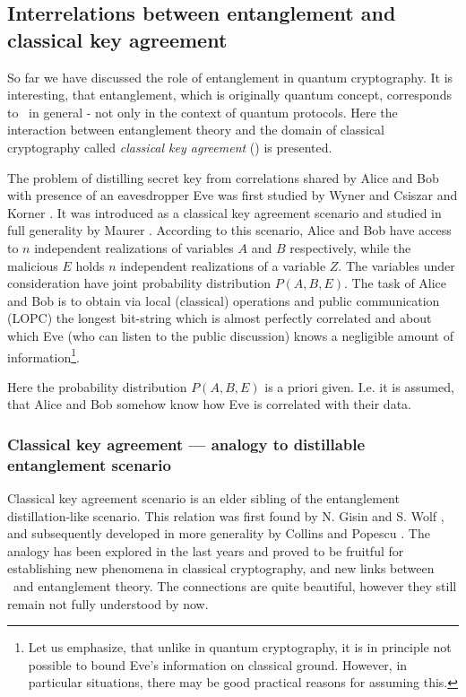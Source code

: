 \documentclass[rmp,12pt,preprint]{revtex4-2}
\begin{document}
\subsection{Interrelations between entanglement and classical key agreement}
\label{subsec:inter-ent-CKA}
So far we have discussed the role of entanglement in quantum
cryptography. It is interesting, that entanglement, which is
originally quantum concept, corresponds to \privacy\ in general -
not only in the context of quantum protocols. Here the interaction
between entanglement theory and the domain of classical cryptography
called {\it classical key agreement} (\cka) is presented.

The problem of distilling secret key from correlations shared by
Alice and Bob with presence of an eavesdropper Eve was first studied
by Wyner \cite{Wyner_key_agreement} and Csiszar and Korner
\cite{CsisarKorner_key_agreement}. It was introduced as a classical
key agreement scenario and studied in full generality by Maurer
\cite{Maurer_key_agreement}. According to this scenario, Alice and
Bob have access to $n$ independent realizations of variables $A$ and
$B$ respectively, while the malicious $E$ holds $n$ independent
realizations of a variable $Z$. The variables under consideration
have joint probability distribution $P(A,B,E)$. The task of Alice
and Bob is to obtain via local (classical) operations and public
communication (LOPC) the longest bit-string which is almost
perfectly correlated and about which Eve (who can listen to the
public discussion) knows a negligible amount of
information\footnote{Let us emphasize, that unlike in quantum
cryptography,  it is in principle not possible to bound Eve's
information on classical ground. However, in particular situations,
there may be good practical reasons for assuming this.}.

Here the probability distribution $P(A,B,E)$ is a priori given.
I.e. it is assumed, that Alice and Bob somehow know how Eve is
correlated with their data.

\subsubsection{Classical key agreement --- analogy to distillable entanglement scenario}

Classical key agreement scenario is an elder sibling of the
entanglement distillation-like scenario. This relation was first
found by N. Gisin and S. Wolf
\cite{GisinWolf_QKAvsCKA,GisinWolf_linking}, and subsequently
developed in more generality by Collins and Popescu
\cite{Collins-Popescu}. The analogy has been explored in the last
years and proved to be fruitful for establishing new phenomena in
classical cryptography, and new links between \privacy\ and
entanglement theory. The connections are quite beautiful, however
they still remain not fully understood by now.
\end{document}
